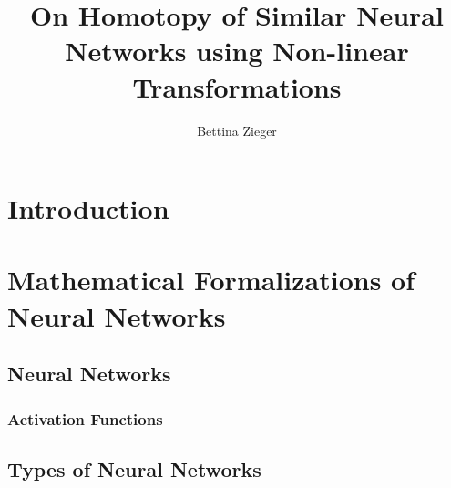 \documentclass[a4paper, fontsize=12pt,
parskip=half,	%
department=FakIM,  %
twoside, %
DIV=15,BCOR=10mm, %
]{OTHRreprt}%
\title{On Homotopy of Similar Neural Networks using Non-linear Transformations}
\author{Bettina Zieger}
\begin{document}
        \maketitle
		\cleardoublepage
		\tableofcontents
		\cleardoublepage

	
    
	\newpage
    

	
	
	

	\chapter{Introduction}\label{Introduction}
    
        \chapter{Mathematical Formalizations of Neural Networks}\label{NN_RW}
        
        \section{Neural Networks}\label{NN}
        
        \subsection{Activation Functions}\label{ActFunc}
        
		\newpage
        \section{Types of Neural Networks}\label{ToNN}
        
\end{document}
